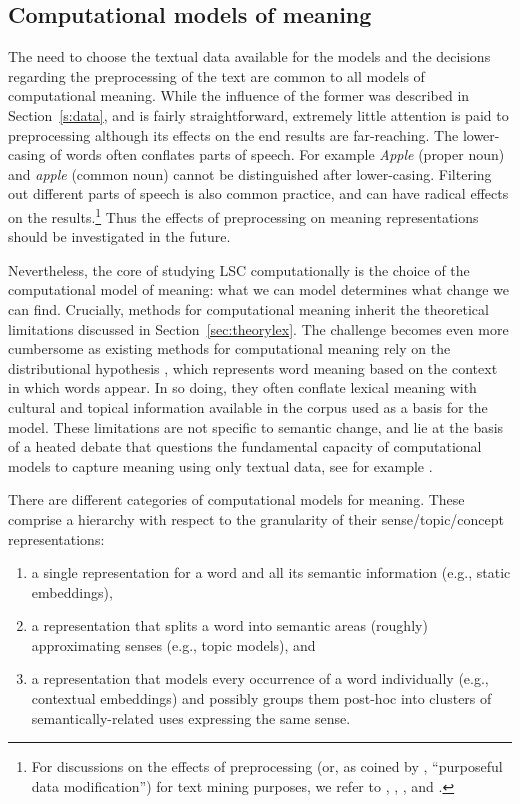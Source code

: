 \documentclass[output=paper]{langscibook}
\begin{document}
\subsection{Computational models of meaning}

The need to choose the textual data available for the models and the decisions regarding the preprocessing  of the text are common to all models of computational meaning. While the influence of the former was described in Section~\ref{s:data}, and is fairly straightforward, extremely little attention is paid to preprocessing although its effects on the end results are far-reaching. 
The lower-casing of words often conflates parts of speech. For example \emph{Apple} (proper noun) and \emph{apple} (common noun) cannot be distinguished after lower-casing. Filtering out different parts of speech is also common practice, and can have radical effects on the results.\footnote{For discussions on the effects of preprocessing (or, as coined by \citealt{thompson-mimno-2018-authorless}, ``purposeful data modification'') for text mining purposes, we refer to \citet{schofield-mimno-2016-comparing}, \citet{schofield2017pulling}, \citet{denny2018text}, and \citet{tahmasebi2019strengths}.} Thus the effects of preprocessing on meaning representations should be investigated in the future.  

Nevertheless, the core of studying LSC computationally is the choice of the computational model of meaning: what we can model determines what change we can find. Crucially, methods for computational meaning inherit the theoretical limitations discussed in Section~\ref{sec:theorylex}. The challenge becomes even more cumbersome as existing methods for computational meaning rely on the distributional hypothesis \citep{harris1954distributional}, which represents word meaning based on the context in which words appear. In so doing, they often conflate lexical meaning with cultural and topical information available in the corpus used as a basis for the model. These limitations are not specific to semantic change, and lie at the basis of a heated debate that questions the fundamental capacity of computational models to capture meaning using only textual data, see for example \citet{bender2020climbing}.

There are different categories of computational models for meaning. These comprise a hierarchy with respect to the granularity of their sense/topic/concept representations:
 \begin{enumerate}[label=(\alph*)]
 \item a single representation for a word and all its semantic information (e.g., static embeddings),
 \item a representation that splits a word into semantic areas (roughly) approximating senses (e.g., topic models), and 
 \item a representation that models every occurrence of a word individually (e.g., contextual embeddings) and possibly groups them post-hoc into clusters of semantically-related uses expressing the same sense.
 \end{enumerate}
\end{document}
